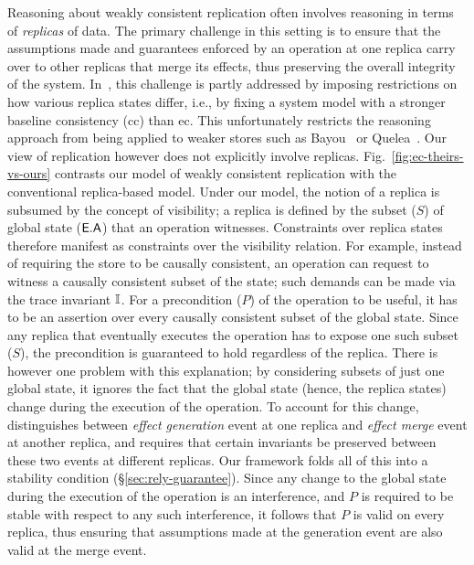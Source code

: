Reasoning about weakly consistent replication often involves reasoning
in terms of \emph{replicas} of data. The primary challenge in this
setting is to ensure that the assumptions made and guarantees enforced
by an operation at one replica carry over to other replicas that merge
its effects, thus preserving the overall integrity of the system.
In~\cite{gotsmanpopl16}, this challenge is partly addressed by
imposing restrictions on how various replica states differ, i.e., by
fixing a system model with a stronger baseline consistency ({\sc cc})
than {\sc ec}. This unfortunately restricts the reasoning approach
from being applied to weaker stores such as Bayou~\cite{bayou} or
Quelea~\cite{pldi15}. Our view of replication however does not
explicitly involve replicas.  Fig.~\ref{fig:ec-theirs-vs-ours}
contrasts our model of weakly consistent replication with the
conventional replica-based model.  Under our model, the notion of a
replica is subsumed by the concept of visibility; a replica is defined
by the subset ($S$) of global state ($\textsf{E}.\textsf{A}$) that an operation
witnesses. Constraints over replica states therefore manifest as
constraints over the visibility relation.  For example, instead of
requiring the store to be causally consistent, an operation can
request to witness a causally consistent subset of the state; such
demands can be made via the trace invariant $\mathbb{I}$. For a precondition
($P$) of the operation to be useful, it has to be an assertion over
every causally consistent subset of the global state.  Since any
replica that eventually executes the operation has to expose one such
subset ($S$), the precondition is guaranteed to hold regardless of the
replica. There is however one problem with this explanation; by
considering subsets of just one global state, it ignores the fact that
the global state (hence, the replica states) change during the
execution of the operation. To account for this
change,~\cite{gotsmanpopl16} distinguishes between \emph{effect
generation} event at one replica and \emph{effect merge} event at
another replica, and requires that certain invariants be preserved
between these two events at different replicas. Our framework folds
all of this into a stability condition (\S\ref{sec:rely-guarantee}).
Since any change to the global state during the execution of the
operation is an interference, and $P$ is required to be stable with
respect to any such interference, it follows that $P$ is valid on
every replica, thus ensuring that assumptions made at the generation
event are also valid at the merge event.

